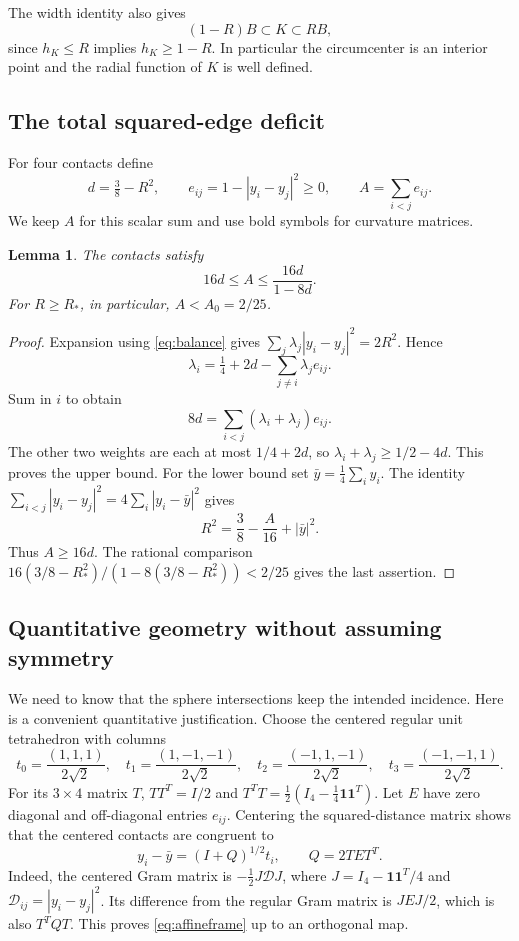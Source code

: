 \documentclass[11pt]{article}
\numberwithin{equation}{section}
\newtheorem{lemma}[theorem]{Lemma}
\theoremstyle{definition}\newtheorem{definition}[theorem]{Definition}
\theoremstyle{remark}\newtheorem{remark}[theorem]{Remark}
\newcommand{\RS}{R_*}
\begin{document}
The width identity also gives
\begin{equation}\label{eq:innerouter}
 (1-R)B\subset K\subset RB,
\end{equation}
since $h_K\le R$ implies $h_K\ge1-R$. In particular the circumcenter is an
interior point and the radial function of $K$ is well defined.

\subsection{The total squared-edge deficit}
For four contacts define
\[
 d=\tfrac38-R^2,\qquad e_{ij}=1-|y_i-y_j|^2\ge0,\qquad
 A=\sum_{i<j}e_{ij}.
\]
We keep $A$ for this scalar sum and use bold symbols for curvature matrices.

\begin{lemma}\label{lem:budget}
The contacts satisfy
\begin{equation}\label{eq:budget}
 \boxed{16d\le A\le\frac{16d}{1-8d}.}
\end{equation}
For $R\ge\RS$, in particular, $A<A_0=2/25$.
\end{lemma}
\begin{proof}
Expansion using \cref{eq:balance} gives
$\sum_j\lambda_j|y_i-y_j|^2=2R^2$. Hence
\[
 \lambda_i=\tfrac14+2d-\sum_{j\ne i}\lambda_j e_{ij}.
\]
Sum in $i$ to obtain
\[
 8d=\sum_{i<j}(\lambda_i+\lambda_j)e_{ij}.
\]
The other two weights are each at most $1/4+2d$, so
$\lambda_i+\lambda_j\ge1/2-4d$. This proves the upper bound. For the lower
bound set $\bar y=\frac14\sum_i y_i$. The identity
$\sum_{i<j}|y_i-y_j|^2=4\sum_i|y_i-\bar y|^2$ gives
\begin{equation}\label{eq:centroid}
 R^2=\frac38-\frac A{16}+|\bar y|^2.
\end{equation}
Thus $A\ge16d$. The rational comparison
$16(3/8-\RS^2)/(1-8(3/8-\RS^2))<2/25$ gives the last assertion.
\end{proof}

\subsection{Quantitative geometry without assuming symmetry}\label{sec:gram}
We need to know that the sphere intersections keep the intended incidence.
Here is a convenient quantitative justification. Choose the centered regular
unit tetrahedron with columns
\[
 t_0=\frac{(1,1,1)}{2\sqrt2},\quad
 t_1=\frac{(1,-1,-1)}{2\sqrt2},\quad
 t_2=\frac{(-1,1,-1)}{2\sqrt2},\quad
 t_3=\frac{(-1,-1,1)}{2\sqrt2}.
\]
For its $3\times4$ matrix $T$, $TT^T=I/2$ and
$T^TT=\frac12(I_4-\frac14\mathbf1\mathbf1^T)$. Let $E$ have zero diagonal
and off-diagonal entries $e_{ij}$. Centering the squared-distance matrix
shows that the centered contacts are congruent to
\begin{equation}\label{eq:affineframe}
 y_i-\bar y=(I+Q)^{1/2}t_i,\qquad Q=2TET^T.
\end{equation}
Indeed, the centered Gram matrix is $-\frac12J\mathcal D J$, where
$J=I_4-\mathbf1\mathbf1^T/4$ and $\mathcal D_{ij}=|y_i-y_j|^2$.
Its difference from the regular Gram matrix is $JEJ/2$, which is also
$T^TQT$. This proves \cref{eq:affineframe} up to an orthogonal map.
\end{document}
